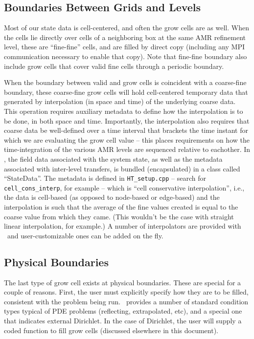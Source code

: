 \subsection{Boundaries Between Grids and Levels}
Most of our state data is cell-centered, and often the grow cells are
as well.  When the cells lie directly over cells of a neighboring box
at the same AMR refinement level, these are ``fine-fine'' cells, and are
filled by direct copy (including any MPI communication necessary to enable
that copy).  Note that fine-fine boundary also include grow cells that
cover valid fine cells through a periodic boundary.

When the boundary between valid and grow cells is coincident
with a coarse-fine boundary, these coarse-fine grow cells will hold cell-centered 
temporary data that generated by interpolation (in space and time) of the
underlying coarse data.  This operation requires auxiliary metadata to define 
how the interpolation is to be done, in both space and time.  Importantly,
the interpolation also requires that coarse data be well-defined over
a time interval that brackets the time instant for which we are evaluating
the grow cell value  -- this places requirements on how the time-integration 
of the various AMR levels are sequenced relative to eachother.
In \amrex, the field data associated with the system state, as well as the metadata
associated with inter-level transfers, is bundled (encapsulated) in
a class called ``StateData''.  The metadata 
is defined in {\tt HT\_setup.cpp} -- search for
{\tt cell\_cons\_interp}, for example -- which is ``cell conservative
interpolation'', i.e., the data is cell-based (as opposed to node-based
or edge-based) and the interpolation is such that the average of the
fine values created is equal to the coarse value from which they came.
(This wouldn't be the case with straight linear interpolation, for
example.)  A number of interpolators are provided with \amrex\ and 
user-customizable ones can be added on the fly.

\subsection{Physical Boundaries}
The last type of grow cell exists at physical boundaries.  These are special for 
a couple of reasons.  First, the user must explicitly specify how they are to be
filled, consistent with the problem being run.  \amrex\ provides a number of 
standard condition types typical of PDE problems (reflecting, extrapolated, etc),
and a special one that indicates external Dirichlet. In the case of Dirichlet,
the user will supply a coded function to fill grow cells (discussed elsewhere in
this document).


